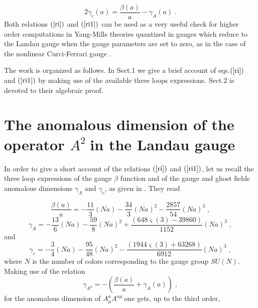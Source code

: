 \documentclass[a4paper,12pt]{article}
\begin{document}
\begin{equation}
2\gamma _{c}(a)=\frac{\beta (a)}{a}-\gamma _{A}(a)\;.  \label{ri1}
\end{equation}
Both relations $\left( \ref{ri}\right) $ and $\left( \ref{ri1}\right) $ can
be used as a very useful check for higher order computations in Yang-Mills
theories quantized in gauges which reduce to the Landau gauge when the gauge
parameters are set to zero, as in the case of the nonlinear Curci-Ferrari
gauge \cite{gr}.

The work is organized as follows. In Sect.1 we give a brief account of eqs.$%
\left( \ref{ri}\right) $ and $\left( \ref{ri1}\right) $ by making use of the
available three loops expressions. Sect.2 is devoted to their algebraic
proof.

\section{The anomalous dimension of the operator $A^{2}\;$in the Landau gauge
}

In order to give a short account of the relations $\left( \ref{ri}\right) $
and $\left( \ref{ri1}\right) $, let us recall the three loop expressions of
the gauge $\beta $ function and of the gauge and ghost fields anomalous
dimensions $\gamma _{A}$ and $\gamma _{c}$, as given in \cite{gr}. They read

\begin{equation}
\frac{\beta (a)}{a}=-\frac{11}{3}\left( Na\right) -\frac{34}{3}\left(
Na\right) ^{2}-\frac{2857}{54}\left( Na\right) ^{3}\;,  \label{beta}
\end{equation}
\begin{equation}
\gamma _{A}=-\frac{13}{6}\left( Na\right) -\frac{59}{8}\left( Na\right) ^{2}+%
\frac{\left( 648\varsigma (3)-39860\right) }{1152}\left( Na\right) ^{3}\;,
\label{ga}
\end{equation}
and 
\begin{equation}
\gamma _{c}=-\frac{3}{4}\left( Na\right) -\frac{95}{48}\left( Na\right) ^{2}-%
\frac{\left( 1944\varsigma (3)+63268\right) }{6912}\left( Na\right) ^{3}\;,
\label{gc}
\end{equation}
where $N$ is the number of colors corresponding to the gauge group $SU(N)$.
Making use of the relation 
\begin{equation}
\gamma _{A^{2}}=-\left( \frac{\beta (a)}{a}+\gamma _{A}(a)\right) \;,
\label{ga2}
\end{equation}
for the anomalous dimension of $A_{\mu }^{a}A^{a\mu \;}$one gets, up to the
third order,
\end{document}
